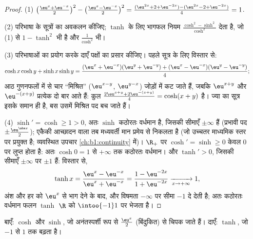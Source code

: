 \begin{proof}
(1) $\bigl(\frac{\eu^x + \eu^{-x}}{2}\bigr)^2 - \bigl(\frac{\eu^x -
\eu^{-x}}{2}\bigr)^2 = \frac{(\eu^{2x} + 2 + \eu^{-2x}) - (\eu^{2x} -
2 + \eu^{-2x})}{4} = 1$.

(2) परिभाषा के सूत्रों का अवकलन कीजिए; $\tanh$ के लिए भागफल नियम
$\frac{\cosh^2 - \sinh^2}{\cosh^2}$ देता है, जो (1) से $1 - \tanh^2$ भी है
और $\frac{1}{\cosh^2}$ भी।

(3) परिभाषाओं का प्रयोग करके दाएँ पक्षों का प्रसार कीजिए। पहले सूत्र के लिए
विस्तार से:
\[
\cosh x\cosh y + \sinh x\sinh y
= \frac{(\eu^x + \eu^{-x})(\eu^y + \eu^{-y})
+ (\eu^x - \eu^{-x})(\eu^y - \eu^{-y})}{4} ;
\]
आठ गुणनफलों में से चार ``मिश्रित'' ($\eu^{x-y}$, $\eu^{y-x}$) जोड़ों में कट
जाते हैं, जबकि $\eu^{x+y}$ और $\eu^{-(x+y)}$ प्रत्येक दो बार आते हैं: कुल
$\frac{2\eu^{x+y} + 2\eu^{-(x+y)}}{4} = \cosh(x+y)$ है। ज्या का सूत्र इसके
समान ही है, बस उसमें मिश्रित पद बच जाते हैं।

(4) $\sinh' = \cosh \geq 1 > 0$, अतः $\sinh$ कठोरतः वर्धमान है, जिसकी सीमाएँ
$\pm\infty$ हैं (प्रभावी पद $\pm\frac{\eu^{\abs x}}{2}$); एकैकी आच्छादन वाला
 तब मध्यवर्ती मान प्रमेय से निकलता है (जो उच्चतर माध्यमिक स्तर पर
प्रयुक्त है; व्यवस्थित उपचार \cref{ch:b1:continuity} में)। $\R_+$ पर $\cosh'
= \sinh \geq 0$ केवल $0$ पर लुप्त होता है: अतः $\cosh 0 = 1$ से $+\infty$ तक
कठोरतः वर्धमान। और $\tanh' > 0$, जिसकी सीमाएँ $\pm\infty$ पर $\pm 1$ हैं:
विस्तार से,
\[
\tanh x = \frac{\eu^x - \eu^{-x}}{\eu^x + \eu^{-x}}
= \frac{1 - \eu^{-2x}}{1 + \eu^{-2x}}
\xrightarrow[x \to +\infty]{} 1 ,
\]
अंश और हर को $\eu^x$ से भाग देने के बाद, और विषमता $-\infty$ पर सीमा $-1$ दे
देती है; अतः कठोरतः वर्धमान फलन $\tanh$ $\R$ को $\intoo{-1}1$ पर भेजता है।
\end{proof}

\begin{omfigure}

{\small बाएँ: $\cosh$ और $\sinh$, जो अनंतस्पर्शी रूप से $\frac{\eu^x}{2}$
(बिंदुकित) से चिपक जाते हैं। दाएँ: $\tanh$, जो $-1$ से $1$ तक बढ़ता है।}
\end{omfigure}

